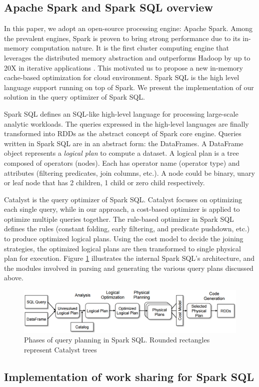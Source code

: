 \subsection{Apache Spark and Spark SQL overview}
% 
In this paper, we adopt an open-source processing engine: Apache Spark. Among the prevalent engines, Spark is proven to bring strong performance due to its in-memory computation nature. It is the first cluster computing engine that leverages the distributed memory abstraction and outperforms Hadoop by up to 20X in iterative applications \cite{zaharia2012resilient}. This motivated us to propose a new in-memory cache-based optimization for cloud environment. Spark SQL is the high level language support running on top of Spark. We present the implementation of our solution in the query optimizer of Spark SQL.

Spark SQL defines an SQL-like high-level language for processing large-scale analytic workloads. The queries expressed in the high-level languages are finally transformed into RDDs as the abstract concept of Spark core engine. Queries written in Spark SQL are in an abstract form: the DataFrames. A DataFrame object represents a \emph{logical plan} to compute a dataset. A logical plan is a tree composed of operators (nodes). Each has operator name (operator type) and attributes (filtering predicates, join columns, etc.). A node could be binary, unary or leaf node that has 2 children, 1 child or zero child respectively.

Catalyst \cite{sparksql} is the query optimizer of Spark SQL. Catalyst focuses on optimizing each single query, while in our approach, a cost-based optimizer is applied to optimize multiple queries together. The rule-based optimizer in Spark SQL defines the rules (constant folding, early filtering, and predicate pushdown, etc.) to produce optimized logical plans. Using the cost model to decide the joining strategies, the optimized logical plans are then transformed to single physical plan for execution. Figure \ref{fig:sparksql_queryplanning} illustrates the internal Spark SQL's architecture, and the modules involved in parsing and generating the various query plans discussed above.

\begin{figure}[t]
   \centering
   \includegraphics[scale=0.45]{figures/sparksql_queryplanning}
   \caption{Phases of query planning in Spark SQL. Rounded rectangles represent Catalyst trees \cite{sparksql}} 
   \label{fig:sparksql_queryplanning}
\end{figure}

\subsection{Implementation of work sharing for Spark SQL}
\label{sec:plan_implementation}



